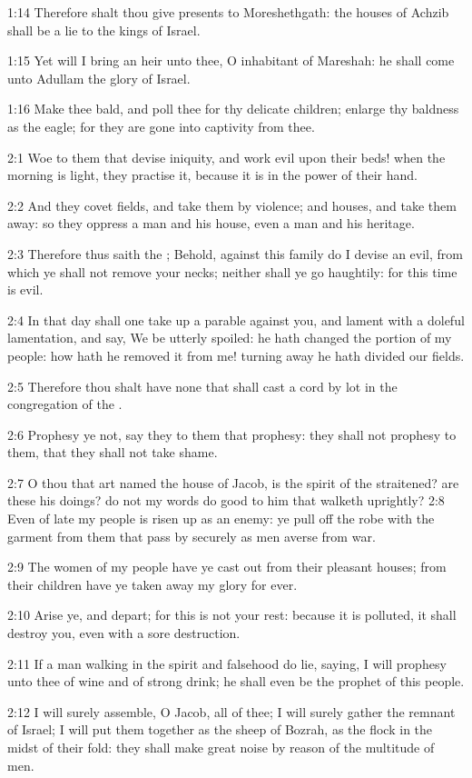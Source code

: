 1:14 Therefore shalt thou give presents to Moreshethgath: the houses of Achzib shall be a lie to the kings of Israel.

1:15 Yet will I bring an heir unto thee, O inhabitant of Mareshah: he shall come unto Adullam the glory of Israel.

1:16 Make thee bald, and poll thee for thy delicate children; enlarge thy baldness as the eagle; for they are gone into captivity from thee.

2:1 Woe to them that devise iniquity, and work evil upon their beds!  when the morning is light, they practise it, because it is in the power of their hand.

2:2 And they covet fields, and take them by violence; and houses, and take them away: so they oppress a man and his house, even a man and his heritage.

2:3 Therefore thus saith the \LORD; Behold, against this family do I devise an evil, from which ye shall not remove your necks; neither shall ye go haughtily: for this time is evil.

2:4 In that day shall one take up a parable against you, and lament with a doleful lamentation, and say, We be utterly spoiled: he hath changed the portion of my people: how hath he removed it from me!  turning away he hath divided our fields.

2:5 Therefore thou shalt have none that shall cast a cord by lot in the congregation of the \LORD.

2:6 Prophesy ye not, say they to them that prophesy: they shall not prophesy to them, that they shall not take shame.

2:7 O thou that art named the house of Jacob, is the spirit of the \LORD straitened? are these his doings? do not my words do good to him that walketh uprightly?  2:8 Even of late my people is risen up as an enemy: ye pull off the robe with the garment from them that pass by securely as men averse from war.

2:9 The women of my people have ye cast out from their pleasant houses; from their children have ye taken away my glory for ever.

2:10 Arise ye, and depart; for this is not your rest: because it is polluted, it shall destroy you, even with a sore destruction.

2:11 If a man walking in the spirit and falsehood do lie, saying, I will prophesy unto thee of wine and of strong drink; he shall even be the prophet of this people.

2:12 I will surely assemble, O Jacob, all of thee; I will surely gather the remnant of Israel; I will put them together as the sheep of Bozrah, as the flock in the midst of their fold: they shall make great noise by reason of the multitude of men.

